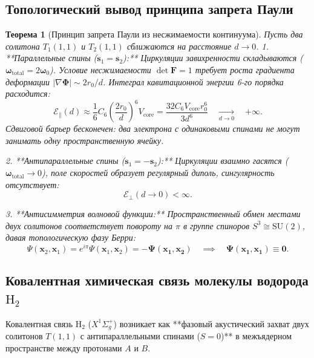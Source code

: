 \documentclass[11pt,a4paper,oneside]{article}
\theoremstyle{plain}
\newtheorem{theorem}{Теорема}[section]
\theoremstyle{definition}
\theoremstyle{remark}
\numberwithin{equation}{section}
\begin{document}
\subsection{Топологический вывод принципа запрета Паули}

\begin{theorem}[Принцип запрета Паули из несжимаемости континуума]
	Пусть два солитона $T_1(1,1)$ и $T_2(1,1)$ сближаются на расстояние $d \to 0$.
	1. **Параллельные спины ($\mathbf{s}_1 = \mathbf{s}_2$):** Циркуляции завихренности складываются ($\boldsymbol{\omega}_{\text{total}} = 2\boldsymbol{\omega}_0$). Условие несжимаемости $\det\mathbf{F}=1$ требует роста градиента деформации $|\nabla\boldsymbol{\Phi}| \sim 2r_0/d$. Интеграл кавитационной энергии 6-го порядка расходится:
	\begin{equation}
		\mathcal{E}_{\parallel}(d) \approx \frac{1}{6} C_6 \left(\frac{2 r_0}{d}\right)^6 V_{\text{core}} = \frac{32 C_6 V_{\text{core}} r_0^6}{3 d^6} \quad \xrightarrow[d \to 0]{} \quad \mathbf{+\infty}.
		\label{eq:pauli_divergence}
	\end{equation}
	Сдвиговой барьер бесконечен: два электрона с одинаковыми спинами не могут занимать одну пространственную ячейку.
	
	2. **Антипараллельные спины ($\mathbf{s}_1 = -\mathbf{s}_2$):** Циркуляции взаимно гасятся ($\boldsymbol{\omega}_{\text{total}} \to 0$), поле скоростей образует регулярный диполь, сингулярность отсутствует:
	\begin{equation}
		\mathcal{E}_{\perp}(d \to 0) < \infty.
	\end{equation}
	
	3. **Антисимметрия волновой функции:** Пространственный обмен местами двух солитонов соответствует повороту на $\pi$ в группе спиноров $S^3 \cong \mathrm{SU}(2)$, давая топологическую фазу Берри:
	\begin{equation}
		\Psi(\mathbf{x}_2, \mathbf{x}_1) = e^{i\pi} \Psi(\mathbf{x}_1, \mathbf{x}_2) = \mathbf{-\Psi(\mathbf{x}_1, \mathbf{x}_2)} \quad \implies \quad \mathbf{\Psi(\mathbf{x}_1, \mathbf{x}_1) \equiv 0}.
	\end{equation}
\end{theorem}

\subsection{Ковалентная химическая связь молекулы водорода $\text{H}_2$}

Ковалентная связь $\text{H}_2$ ($X^1\Sigma_g^+$) возникает как **фазовый акустический захват двух солитонов $T(1,1)$ с антипараллельными спинами ($S=0$)** в межъядерном пространстве между протонами $A$ и $B$.
\end{document}
